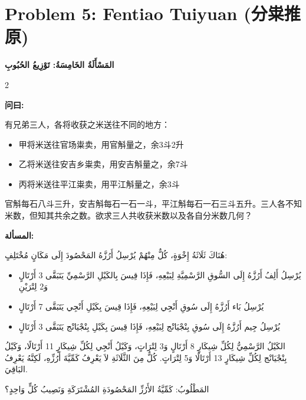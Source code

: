 \documentclass[11pt,a4paper]{article}
\newcommand{\ar}[1]{\arabicfont\beginR #1\endR}
\newcommand{\zhtext}[1]{{\chinese #1}}
\newenvironment{bilingual}{%
  \begin{paracol}{2}
}{%
  \end{paracol}
}
\newcommand{\cnlabel}[1]{\textcolor{algocolor}{\textbf{#1}}}
\newcommand{\arlabel}[1]{\ar{\textcolor{algocolor}{\textbf{#1}}}}
\begin{document}
\section{Problem 5: Fentiao Tuiyuan (\zhtext{分粜推原})}
\ar{\textbf{المَسْأَلَةُ الخَامِسَةُ: تَوْزِيعُ الحُبُوبِ}}

\begin{bilingual}

\begin{leftcolumn*}
\cnlabel{问曰:}

有兄弟三人，各将收获之米送往不同的地方：
\begin{itemize}
  \item 甲将米送往官场粜卖，用官斛量之，余3斗2升
  \item 乙将米送往安吉乡粜卖，用安吉斛量之，余7斗
  \item 丙将米送往平江粜卖，用平江斛量之，余3斗
\end{itemize}

官斛每石八斗三升，安吉斛每石一石一斗，平江斛每石一石三斗五升。三人各不知米数，但知其共余之数。欲求三人共收获米数以及各自分米数几何？
\end{leftcolumn*}

\begin{rightcolumn*}
\arlabel{المسألة:}

\ar{هُنَاكَ ثَلَاثَةُ إِخْوَةٍ، كُلٌّ مِنْهُمْ يُرْسِلُ أَرُزَّهُ المَحْصُودَ إِلَى مَكَانٍ مُخْتَلِفٍ:}
\begin{itemize}
  \item \ar{يُرْسِلُ أَلِفُ أَرُزَّهُ إِلَى السُّوقِ الرَّسْمِيَّةِ لِبَيْعِهِ، فَإِذَا قِيسَ بِالكَيْلِ الرَّسْمِيِّ يَتَبَقَّى 3 أَرْتَالٍ وَ2 لِتْرَيْنِ}
  \item \ar{يُرْسِلُ بَاء أَرُزَّهُ إِلَى سُوقِ أَنْجِي لِبَيْعِهِ، فَإِذَا قِيسَ بِكَيْلِ أَنْجِي يَتَبَقَّى 7 أَرْتَالٍ}
  \item \ar{يُرْسِلُ جِيم أَرُزَّهُ إِلَى سُوقِ بِنْجْيَانْج لِبَيْعِهِ، فَإِذَا قِيسَ بِكَيْلِ بِنْجْيَانْج يَتَبَقَّى 3 أَرْتَالٍ}
\end{itemize}

\ar{الكَيْلُ الرَّسْمِيُّ لِكُلِّ شِيكَارٍ 8 أَرْتَالٍ وَ3 لِتْرَاتٍ، وَكَيْلُ أَنْجِي لِكُلِّ شِيكَارٍ 11 أَرْتَالًا، وَكَيْلُ بِنْجْيَانْج لِكُلِّ شِيكَارٍ 13 أَرْتَالًا وَ5 لِتْرَاتٍ. كُلٌّ مِنَ الثَّلَاثَةِ لاَ يَعْرِفُ كَمِّيَّةَ أَرُزِّهِ، لَكِنَّهُ يَعْرِفُ البَاقِيَ.}

\ar{المَطْلُوبُ: كَمِّيَّةُ الأَرُزِّ المَحْصُودَةِ المُشْتَرَكَةِ وَنَصِيبُ كُلٍّ وَاحِدٍ؟}
\end{rightcolumn*}

\end{bilingual}
\end{document}
